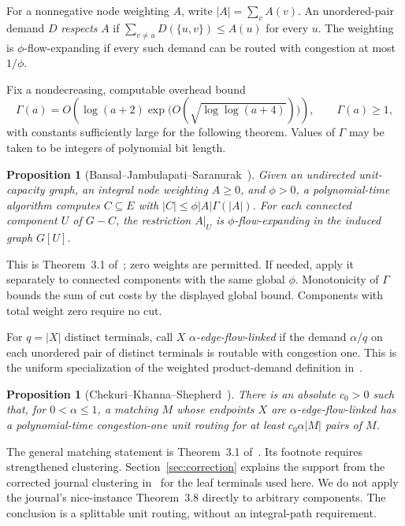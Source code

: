 \documentclass[acmsmall,11pt,screen,nonacm]{acmart}
\newtheorem{proposition}[theorem]{Proposition}
\begin{document}
For a nonnegative node weighting $A$, write $|A|=\sum_v A(v)$.
An unordered-pair demand $D$ \emph{respects} $A$ if
$\sum_{v\ne u}D(\{u,v\})\le A(u)$ for every $u$. The weighting is
$\phi$-flow-expanding if every such demand can be routed with congestion
at most $1/\phi$.

Fix a nondecreasing, computable overhead bound
\begin{equation}\label{eq:gamma}
 \Gamma(a)=O\!\left(\log(a+2)
       \exp\!\bigl(O(\sqrt{\log\log(a+4)})\bigr)\right),
 \qquad \Gamma(a)\ge1,
\end{equation}
with constants sufficiently large for the following theorem. Values of
$\Gamma$ may be taken to be integers of polynomial bit length.

\begin{proposition}[Bansal--Jambulapati--Saranurak~\cite{BJS26}]
\label{prop:bjs}
Given an undirected unit-capacity graph, an integral node weighting $A\ge0$,
and $\phi>0$, a polynomial-time algorithm computes $C\subseteq E$ with
$|C|\le\phi|A|\Gamma(|A|)$. For each connected component $U$ of $G-C$,
the restriction $A|_U$ is $\phi$-flow-expanding in the induced graph $G[U]$.
\end{proposition}

This is Theorem~3.1 of~\cite{BJS26}; zero weights are permitted. If needed,
apply it separately to connected components with the same global $\phi$.
Monotonicity of $\Gamma$ bounds the sum of cut costs by the displayed global
bound. Components with total weight zero require no cut.

For $q=|X|$ distinct terminals, call $X$ \emph{$\alpha$-edge-flow-linked} if
the demand $\alpha/q$ on each unordered pair of distinct terminals is
routable with congestion one. This is the uniform specialization of the
weighted product-demand definition in~\cite{CKS05}.

\begin{proposition}[Chekuri--Khanna--Shepherd~\cite{CKS05,CKS13}]
\label{prop:cks}
There is an absolute $c_0>0$ such that, for $0<\alpha\le1$, a matching $M$
whose endpoints $X$ are $\alpha$-edge-flow-linked has a polynomial-time
congestion-one unit routing for at least $c_0\alpha|M|$ pairs of $M$.
\end{proposition}

The general matching statement is Theorem~3.1 of~\cite{CKS05}. Its footnote
requires strengthened clustering. Section~\ref{sec:correction} explains the
support from the corrected journal clustering in~\cite[Section~3.4]{CKS13}
for the leaf terminals used here. We do not apply the journal's nice-instance
Theorem~3.8 directly to arbitrary components. The conclusion is a splittable
unit routing, without an integral-path requirement.
\end{document}
